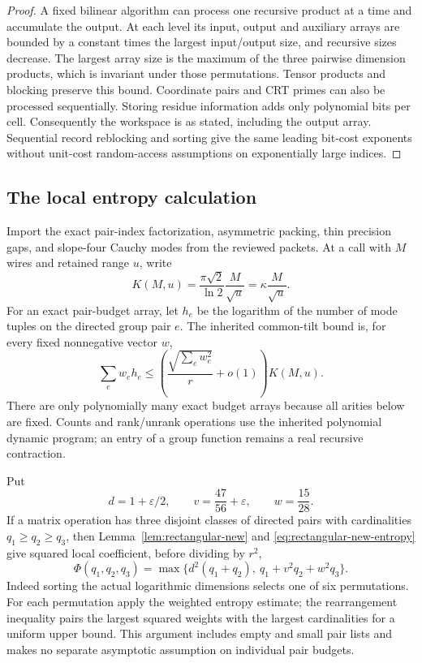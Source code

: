 \begin{proof}
A fixed bilinear algorithm can process one recursive product at a time and
accumulate the output. At each level its input, output and auxiliary arrays
are bounded by a constant times the largest input/output size, and recursive
sizes decrease. The largest array size is the maximum of the three pairwise dimension
products, which is invariant under those permutations. Tensor products
and blocking preserve this bound. Coordinate
pairs and CRT primes can also be processed sequentially. Storing residue
information adds only polynomial bits per cell. Consequently the workspace
is as stated, including the output array. Sequential record reblocking and
sorting give the same leading bit-cost exponents without unit-cost
random-access assumptions on exponentially large indices.
\end{proof}

\subsection{The local entropy calculation}

Import the exact pair-index factorization, asymmetric packing, thin precision
gaps, and slope-four Cauchy modes from the reviewed packets. At a call with
$M$ wires and retained range $u$, write
\[
 K(M,u)=\frac{\pi\sqrt2}{\ln2}\frac M{\sqrt u}=\kappa\frac M{\sqrt u}.
\]
For an exact pair-budget array, let $h_e$ be the logarithm of the number of
mode tuples on the directed group pair $e$. The inherited common-tilt bound
is, for every fixed nonnegative vector $w$,
\begin{equation}\label{eq:rectangular-new-entropy}
 \sum_e w_eh_e\le
 \left(\frac{\sqrt{\sum_e w_e^2}}r+o(1)\right)K(M,u).
\end{equation}
There are only polynomially many exact budget arrays because all arities
below are fixed. Counts and rank/unrank operations use the inherited
polynomial dynamic program; an entry of a group function remains a real
recursive contraction.

Put
\[
 d=1+\varepsilon/2,\qquad
 v=\frac{47}{56}+\varepsilon,\qquad w=\frac{15}{28}.
\]
If a matrix operation has three disjoint classes of directed pairs with
cardinalities $q_1\ge q_2\ge q_3$, then Lemma~\ref{lem:rectangular-new} and
\eqref{eq:rectangular-new-entropy} give squared local coefficient, before
dividing by $r^2$,
\begin{equation}\label{eq:rectangular-new-cardinality}
 \Phi(q_1,q_2,q_3)=
 \max\{d^2(q_1+q_2),\ q_1+v^2q_2+w^2q_3\}.
\end{equation}
Indeed sorting the actual logarithmic dimensions selects one of six
permutations. For each permutation apply the weighted entropy estimate;
the rearrangement inequality pairs the largest squared weights with the
largest cardinalities for a uniform upper bound. This argument includes
empty and small pair lists and makes no separate asymptotic assumption on
individual pair budgets.

